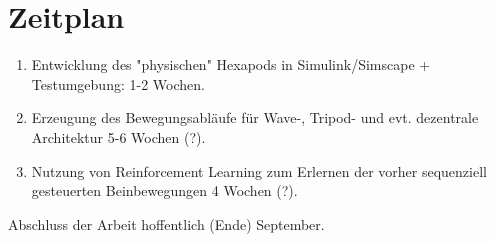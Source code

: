 \section{Zeitplan}
\begin{enumerate}
	\item Entwicklung des "physischen" Hexapods in Simulink/Simscape + Testumgebung: 1-2 Wochen.
	\item Erzeugung des Bewegungsabläufe für Wave-, Tripod- und evt. dezentrale Architektur 5-6 Wochen (?).
	\item Nutzung von Reinforcement Learning zum Erlernen der vorher sequenziell gesteuerten Beinbewegungen 4 Wochen (?).
\end{enumerate}


Abschluss der Arbeit hoffentlich (Ende) September.